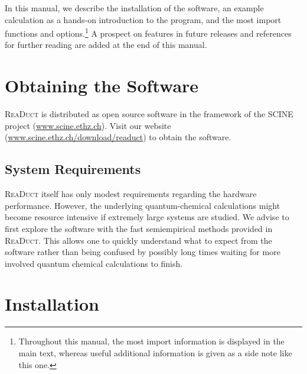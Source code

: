 \documentclass[]{tufte-book}
\begin{document}
In this manual, we describe the installation of the software, an example calculation as a hands-on
introduction to the program, and the most import functions and options.\footnote{Throughout this manual, the most
import information is displayed in the main text, whereas useful additional information is given as a side note like this one.}
A prospect on features in future releases and references for further reading are added at the end of this manual.\enlargethispage{\baselineskip}



\chapter{Obtaining the Software}
\label{ch:obtain}

\textsc{ReaDuct}  is distributed as open source software in the framework of the SCINE project (\href{https://scine.ethz.ch/}{www.scine.ethz.ch}).
Visit our website (\href{https://scine.ethz.ch/download/readuct}{www.scine.ethz.ch/download/readuct}) to obtain the software.


\section{System Requirements}

\textsc{ReaDuct} itself has only modest requirements regarding the hardware performance. However, the underlying quantum-chemical
calculations might become resource intensive if extremely large systems are studied. We advise to first explore the software with
the fast semiempirical methods provided in \textsc{ReaDuct}. This allows one to quickly understand what to expect from the software
rather than being confused by possibly long times waiting for more involved quantum chemical calculations to finish.



\chapter{Installation}\label{ch:installation}
\end{document}
